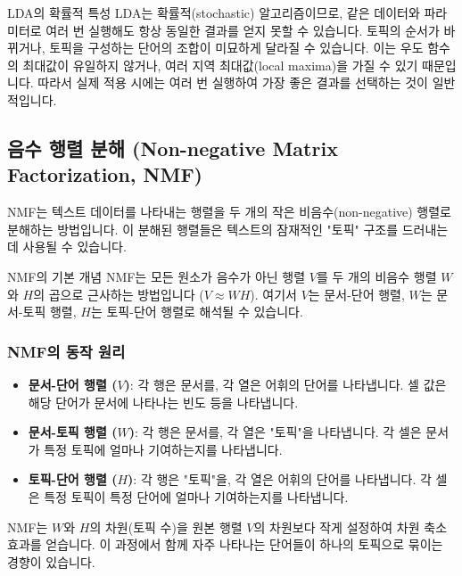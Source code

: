 \documentclass[11pt,a4paper]{article}
\begin{document}
\begin{cautionbox}{LDA의 확률적 특성}
LDA는 확률적(stochastic) 알고리즘이므로, 같은 데이터와 파라미터로 여러 번 실행해도 항상 동일한 결과를 얻지 못할 수 있습니다. 토픽의 순서가 바뀌거나, 토픽을 구성하는 단어의 조합이 미묘하게 달라질 수 있습니다. 이는 우도 함수의 최대값이 유일하지 않거나, 여러 지역 최대값(local maxima)을 가질 수 있기 때문입니다. 따라서 실제 적용 시에는 여러 번 실행하여 가장 좋은 결과를 선택하는 것이 일반적입니다.
\end{cautionbox}

\newpage
\subsection{음수 행렬 분해 (Non-negative Matrix Factorization, NMF)}
NMF는 텍스트 데이터를 나타내는 행렬을 두 개의 작은 비음수(non-negative) 행렬로 분해하는 방법입니다. 이 분해된 행렬들은 텍스트의 잠재적인 "토픽" 구조를 드러내는 데 사용될 수 있습니다.

\begin{definitionbox}{NMF의 기본 개념}
NMF는 모든 원소가 음수가 아닌 행렬 $V$를 두 개의 비음수 행렬 $W$와 $H$의 곱으로 근사하는 방법입니다 ($V \approx WH$). 여기서 $V$는 문서-단어 행렬, $W$는 문서-토픽 행렬, $H$는 토픽-단어 행렬로 해석될 수 있습니다.
\end{definitionbox}

\subsubsection{NMF의 동작 원리}
\begin{itemize}
    \item \textbf{문서-단어 행렬 ($V$)}: 각 행은 문서를, 각 열은 어휘의 단어를 나타냅니다. 셀 값은 해당 단어가 문서에 나타나는 빈도 등을 나타냅니다.
    \item \textbf{문서-토픽 행렬 ($W$)}: 각 행은 문서를, 각 열은 "토픽"을 나타냅니다. 각 셀은 문서가 특정 토픽에 얼마나 기여하는지를 나타냅니다.
    \item \textbf{토픽-단어 행렬 ($H$)}: 각 행은 "토픽"을, 각 열은 어휘의 단어를 나타냅니다. 각 셀은 특정 토픽이 특정 단어에 얼마나 기여하는지를 나타냅니다.
\end{itemize}
NMF는 $W$와 $H$의 차원(토픽 수)을 원본 행렬 $V$의 차원보다 작게 설정하여 차원 축소 효과를 얻습니다. 이 과정에서 함께 자주 나타나는 단어들이 하나의 토픽으로 묶이는 경향이 있습니다.
\end{document}

